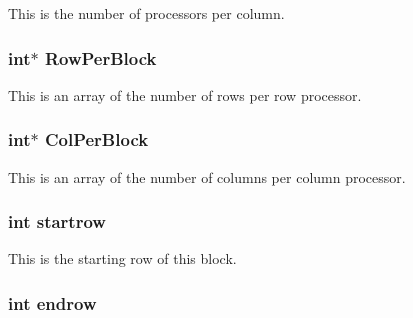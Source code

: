 This is the number of processors per column. \hypertarget{classJKBuilder_1_1DistributedMatrix_a417b5c8d480cf1688e6c403fd29fac12}{
\subsubsection[{RowPerBlock}]{\setlength{\rightskip}{0pt plus 5cm}int$\ast$ {\bf RowPerBlock}}}
\label{classJKBuilder_1_1DistributedMatrix_a417b5c8d480cf1688e6c403fd29fac12}


This is an array of the number of rows per row processor. \hypertarget{classJKBuilder_1_1DistributedMatrix_a19f481b08a628ad2707b1e82bbb88e1d}{
\subsubsection[{ColPerBlock}]{\setlength{\rightskip}{0pt plus 5cm}int$\ast$ {\bf ColPerBlock}}}
\label{classJKBuilder_1_1DistributedMatrix_a19f481b08a628ad2707b1e82bbb88e1d}


This is an array of the number of columns per column processor. \hypertarget{classJKBuilder_1_1DistributedMatrix_a0870e21b7fb2685df81b50e80b22ed7b}{
\subsubsection[{startrow}]{\setlength{\rightskip}{0pt plus 5cm}int {\bf startrow}}}
\label{classJKBuilder_1_1DistributedMatrix_a0870e21b7fb2685df81b50e80b22ed7b}


This is the starting row of this block. \hypertarget{classJKBuilder_1_1DistributedMatrix_ac7e765f729497d4e56e0d42c5ed012a5}{
\subsubsection[{endrow}]{\setlength{\rightskip}{0pt plus 5cm}int {\bf endrow}}}
\label{classJKBuilder_1_1DistributedMatrix_ac7e765f729497d4e56e0d42c5ed012a5}


